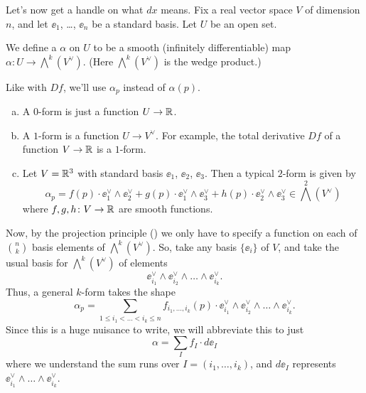 Let's now get a handle on what $dx$ means.
Fix a real vector space $V$ of dimension $n$,
and let $\ee_1$, \dots, $\ee_n$ be a standard basis.
Let $U$ be an open set.

\begin{definition}
	We define a  $\alpha$ on $U$
	to be a smooth (infinitely differentiable) map
	$\alpha \colon U \to \bigwedge^k(V^\vee)$.
	(Here $\bigwedge^k(V^\vee)$ is the wedge product.)
\end{definition}

Like with $Df$, we'll use $\alpha_p$ instead of $\alpha(p)$.

\begin{example}
	[$k$-forms for $k=0,1$]
	\listhack
	\begin{enumerate}[(a)]
		\item A $0$-form is just a function $U \to \mathbb R$.
		\item A $1$-form is a function $U \to V^\vee$.
		For example,
		the total derivative $Df$ of a function $V \to \mathbb R$ is a $1$-form.
		\item Let $V = \mathbb R^3$ with standard basis $\ee_1$, $\ee_2$, $\ee_3$.
		Then a typical $2$-form is given by
		\[
			\alpha_p
			=
			f(p) \cdot \ee_1^\vee \wedge \ee_2^\vee
			+ g(p) \cdot \ee_1^\vee \wedge \ee_3^\vee
			+ h(p) \cdot \ee_2^\vee \wedge \ee_3^\vee
			\in \bigwedge^2(V^\vee)
		\]
		where $f,g,h \colon V \to \mathbb R$ are smooth functions.
	\end{enumerate}
\end{example}

Now, by the projection principle () we only have to specify
a function on each of $\binom nk$ basis elements of $\bigwedge^k(V^\vee)$.
So, take any basis $\{\ee_i\}$ of $V$, and
take the usual basis for $\bigwedge^k(V^\vee)$ of elements
\[ \ee_{i_1}^\vee \wedge \ee_{i_2}^\vee \wedge \dots \wedge \ee_{i_k}^\vee. \]
Thus, a general $k$-form takes the shape
\[ \alpha_p = \sum_{1 \le i_1 < \dots < i_k \le n}
	f_{i_1, \dots, i_k}(p) \cdot
	\ee_{i_1}^\vee \wedge \ee_{i_2}^\vee \wedge \dots \wedge \ee_{i_k}^\vee. \]
Since this is a huge nuisance to write, we will abbreviate this to just
\[ \alpha = \sum_I f_I \cdot d\ee_I \]
where we understand the sum runs over $I = (i_1, \dots, i_k)$,
and $d\ee_I$ represents $\ee_{i_1}^\vee \wedge \dots \wedge \ee_{i_k}^\vee$.

